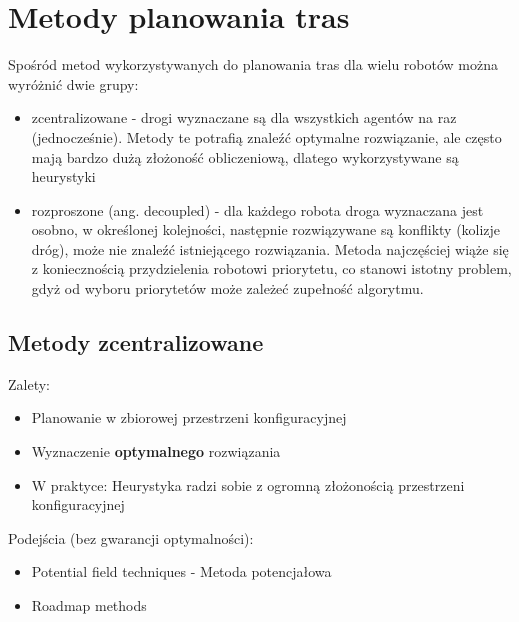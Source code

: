 \section{Metody planowania tras}
Spośród metod wykorzystywanych do planowania tras dla wielu robotów można wyróżnić dwie grupy:
\begin{itemize}
	\item zcentralizowane - drogi wyznaczane są dla wszystkich agentów na raz (jednocześnie). Metody te potrafią znaleźć optymalne rozwiązanie, ale często mają bardzo dużą złożoność obliczeniową, dlatego wykorzystywane są heurystyki
	\item rozproszone (ang. decoupled) - dla każdego robota droga wyznaczana jest osobno, w określonej kolejności, następnie rozwiązywane są konflikty (kolizje dróg), może nie znaleźć istniejącego rozwiązania. Metoda najczęściej wiąże się z koniecznością przydzielenia robotowi priorytetu, co stanowi istotny problem, gdyż od wyboru priorytetów może zależeć zupełność algorytmu.
\end{itemize}

\subsection{Metody zcentralizowane}
Zalety:
\begin{itemize}
	\item Planowanie w zbiorowej przestrzeni konfiguracyjnej
	\item Wyznaczenie {\bf optymalnego} rozwiązania
	\item W praktyce: Heurystyka radzi sobie z ogromną złożonością przestrzeni konfiguracyjnej
\end{itemize}
Podejścia (bez gwarancji optymalności):
\begin{itemize}
	\item Potential field techniques - Metoda potencjałowa
	\item Roadmap methods %
\end{itemize}

